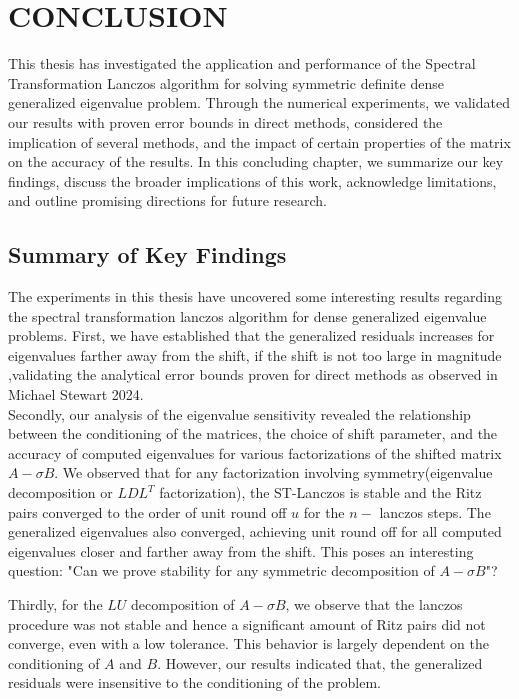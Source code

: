 \chapter{CONCLUSION}
This thesis has investigated the application and performance of the Spectral Transformation Lanczos algorithm for solving symmetric definite dense generalized eigenvalue problem. Through the numerical experiments, we validated our results with proven error bounds in direct methods, considered the implication of several methods, and the impact of certain properties of the matrix on the accuracy of the results. In this concluding chapter, we summarize our key findings, discuss the broader implications of this work, acknowledge limitations, and outline promising directions for future research.

\section{Summary of Key Findings}
The experiments in this thesis have uncovered some interesting results regarding the spectral transformation lanczos algorithm for dense generalized eigenvalue problems. First, we have established that the generalized residuals increases for eigenvalues farther away from the shift, if the shift is not too large in magnitude ,validating the analytical error bounds proven for direct methods as observed in Michael Stewart 2024.\\[10pt]
Secondly, our analysis of the eigenvalue sensitivity revealed the relationship between the conditioning of the matrices, the choice of shift parameter, and the accuracy of computed eigenvalues for various factorizations of the shifted matrix $A-\sigma B$. We observed that for any factorization involving symmetry(eigenvalue decomposition or $LDL^T$ factorization), the ST-Lanczos is stable and the Ritz pairs converged to the order of unit round off $u$ for the $n-$ lanczos steps. The generalized eigenvalues also converged, achieving unit round off for all computed eigenvalues closer and farther away from the shift. This poses an interesting question: "Can we prove stability for any symmetric decomposition of $A - \sigma B$"?

Thirdly, for the $LU$ decomposition of $A - \sigma B$, we observe that the lanczos procedure was not stable and hence a significant amount of Ritz pairs did not converge, even with a low tolerance. This behavior is largely dependent on the conditioning of $A$ and $B$. However, our results indicated that, the generalized residuals were insensitive to the conditioning of the problem.

